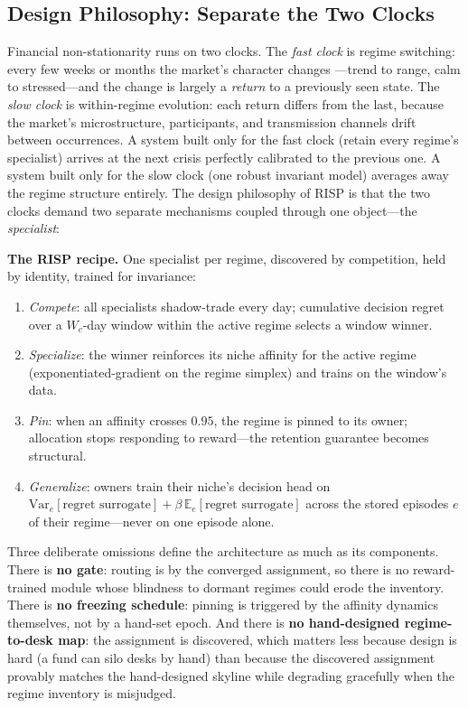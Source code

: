 \documentclass[10pt]{article}
\newcommand{\E}{\mathbb{E}}
\newcommand{\Var}{\mathrm{Var}}
\newcommand{\nm}{\textsc{RISP}}
\begin{document}
\subsection{Design Philosophy: Separate the Two Clocks}

Financial non-stationarity runs on two clocks. The \emph{fast clock} is
regime switching: every few weeks or months the market's character changes
---trend to range, calm to stressed---and the change is largely a
\emph{return} to a previously seen state. The \emph{slow clock} is
within-regime evolution: each return differs from the last, because the
market's microstructure, participants, and transmission channels drift
between occurrences. A system built only for the fast clock (retain every
regime's specialist) arrives at the next crisis perfectly calibrated to
the previous one. A system built only for the slow clock (one robust
invariant model) averages away the regime structure entirely. The design
philosophy of \nm{} is that the two clocks demand two separate mechanisms
coupled through one object---the \emph{specialist}:

\begin{designbox}
\textbf{The \nm{} recipe.} One specialist per regime, discovered by
competition, held by identity, trained for invariance:
\begin{enumerate}[leftmargin=1.6em, nosep]
    \item \emph{Compete}: all specialists shadow-trade every day; cumulative
    decision regret over a $W_c$-day window within the active regime
    selects a window winner.
    \item \emph{Specialize}: the winner reinforces its niche affinity for
    the active regime (exponentiated-gradient on the regime simplex) and
    trains on the window's data.
    \item \emph{Pin}: when an affinity crosses $0.95$, the regime is
    pinned to its owner; allocation stops responding to reward---the
    retention guarantee becomes structural.
    \item \emph{Generalize}: owners train their niche's decision head on
    $\Var_e[\text{regret surrogate}] + \beta\,\E_e[\text{regret
    surrogate}]$ across the stored episodes $e$ of their regime---never on
    one episode alone.
\end{enumerate}
\end{designbox}

Three deliberate omissions define the architecture as much as its
components. There is \textbf{no gate}: routing is by the converged
assignment, so there is no reward-trained module whose blindness to
dormant regimes could erode the inventory. There is \textbf{no freezing
schedule}: pinning is triggered by the affinity dynamics themselves, not
by a hand-set epoch. And there is \textbf{no hand-designed regime-to-desk
map}: the assignment is discovered, which matters less because design is
hard (a fund can silo desks by hand) than because the discovered
assignment provably matches the hand-designed skyline while degrading
gracefully when the regime inventory is misjudged.
\end{document}
